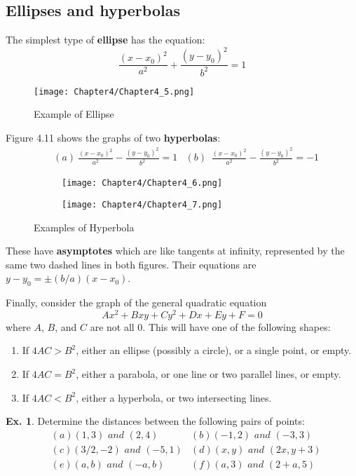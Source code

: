 \documentclass[10pt,a4paper]{book}
\theoremstyle{definition}\newtheorem{definition}{Definition}
\theoremstyle{definition}\newtheorem{fact}{Fact}
\theoremstyle{definition}\newtheorem{ex}{Ex.}
\theoremstyle{definition}\newtheorem{project}{Project}
\theoremstyle{definition}\newtheorem{problem}{Problem}
\theoremstyle{definition}\newtheorem{example}{Example}
\numberwithin{theorem}{chapter}
\numberwithin{corollary}{chapter}
\numberwithin{assumption}{chapter}
\numberwithin{definition}{chapter}
\numberwithin{prop}{chapter}
\numberwithin{notation}{chapter}
\numberwithin{problem}{chapter}
\numberwithin{example}{chapter}
\numberwithin{fact}{chapter}
\numberwithin{ex}{chapter}
\begin{document}
	\subsection{Ellipses and hyperbolas}
	The simplest type of \textbf{ellipse} has the equation:
	$$\frac{(x-x_0)^2}{a^2}+\frac{(y-y_0)^2}{b^2}=1$$
	
	\begin{figure}[H]
		\centering
		\texttt{[image: Chapter4/Chapter4\_5.png]}
		\caption{Example of Ellipse}
	\end{figure}
	
	Figure 4.11 shows the graphs of two \textbf{hyperbolas}:
	\begin{align*}
		& (a) \ \frac{(x-x_0)^2}{a^2}-\frac{(y-y_0)^2}{b^2}=1 & (b) \,\,\,\frac{(x-x_0)^2}{a^2}-\frac{(y-y_0)^2}{b^2}=-1 
	\end{align*}
	
	\begin{figure}[H]
		\centering
		\begin{subfigure}{0.5\textwidth}
			\centering
			\texttt{[image: Chapter4/Chapter4\_6.png]}
		\end{subfigure}%
		\begin{subfigure}{0.5\textwidth}
			\centering
			\texttt{[image: Chapter4/Chapter4\_7.png]}
		\end{subfigure}
		\caption{Examples of Hyperbola}
	\end{figure}
	
	These have \textbf{asymptotes} which are like tangents at infinity, represented by the same two dashed lines in both figures. Their equations are $y - y_0 = \pm(b/a)(x - x_0)$.
	
	Finally, consider the graph of the general quadratic equation
	$$Ax^2+Bxy+Cy^2+Dx+Ey+F=0$$
	where $A$, $B$, and $C$ are not all 0. This will have one of the following shapes:
	\begin{enumerate}[label=(\roman*)]
		\item If $4AC > B^2$, either an ellipse (possibly a circle), or a single point, or empty.
		\item If $4AC = B^2$, either a parabola, or one line or two parallel lines, or empty.
		\item If $4AC < B^2$, either a hyperbola, or two intersecting lines.
	\end{enumerate}
	
	\begin{ex}
		Determine the distances between the following pairs of points:
		\begin{align*}
			& (a) (1,3) \,\,and\,\, (2,4)     
			& (b) (-1,2) \,\,and\,\, (-3,3)   \\
			& (c) (3/2,-2) \,\,and\,\, (-5,1) 
			& (d) (x,y) \,\,and\,\, (2x,y+3)  \\
			& (e) (a,b) \,\,and\,\, (-a,b)    
			& (f) (a,3) \,\,and\,\, (2+a,5)   \\
		\end{align*}
	\end{ex}
	
\end{document}
